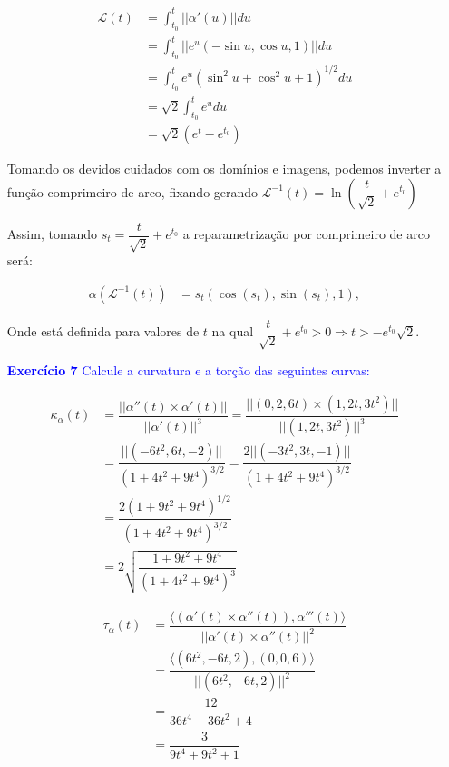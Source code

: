 \documentclass[12pt,letterpaper]{article}
\newcommand\lcur{\mathcal{L}}
\newcommand{\real}{\mathbb{R}}
\newcommand{\ex}[1]{\textcolor{blue}{\textbf{Exercício #1}}}
\newcommand{\blue}[1]{{\color{blue}{#1}}}
\begin{document}
\begin{enumerate}
	\begin{align*}
		\lcur(t)&=\int_{t_0}^{t}||\alpha'(u)||du\\
		&=\int_{t_0}^{t}||e^u(-\sin u,\cos u,1)||du\\
		&=\int_{t_0}^{t}e^u(\sin^2u+\cos^2u+1)^{1/2}du\\
		&=\sqrt2\int_{t_0}^{t}e^udu\\
		&=\sqrt2(e^t-e^{t_0})
	\end{align*}
		
		Tomando os devidos cuidados com os domínios e imagens, podemos inverter a função comprimeiro de arco, fixando  gerando $\lcur^{-1}(t)=\ln\left(\dfrac{t}{\sqrt2}+e^{t_0}\right)$
		
		Assim, tomando $s_t=\dfrac{t}{\sqrt2}+e^{t_0}$ a reparametrização por comprimeiro de arco será:
		
		\begin{align*}
			\alpha(\lcur^{-1}(t))&=s_t\left(\cos\left(s_t\right),\sin\left(s_t\right),1\right),
		\end{align*}
	
	Onde está definida para valores de $t$ na qual $\dfrac{t}{\sqrt2}+e^{t_0}>0\Rightarrow t>-e^{t_0}\sqrt2$.
	
	\item[\ex{7}] \textcolor{blue}{Calcule a curvatura e a torção das seguintes curvas:}
		\begin{enumerate}[(a)]
			\blue{
			\item $\alpha(t)=(t,t^2,t^3),t\in\real$}
				\begin{align*}
					\kappa_{\alpha}(t)&=\dfrac{||\alpha''(t)\times\alpha'(t)||}{||\alpha'(t)||^3}
					=\dfrac{||(0,2,6t)\times(1,2t,3t^2)||}{||(1,2t,3t^2)||^3}\\
					&=\dfrac{||(-6 t^2, 6 t, -2)||}{(1+4t^2+9t^4)^{3/2}}
					=\dfrac{2||(-3t^2,3t,-1)||}{(1+4t^2+9t^4)^{3/2}}\\
					&=\dfrac{2(1+9t^2+9t^4)^{1/2}}{(1+4t^2+9t^4)^{3/2}}\\
					&=2\sqrt{\dfrac{1+9t^2+9t^4}{(1+4t^2+9t^4)^3}}
				\end{align*}
			
			
			
			\begin{align*}
				\tau_\alpha(t)&=\dfrac{\langle(\alpha'(t)\times\alpha''(t)),\alpha'''(t)\rangle}{||\alpha'(t)\times\alpha''(t)||^2}\\
				&=\dfrac{\langle(6 t^2, -6 t, 2),(0,0,6)\rangle}{||(6 t^2, -6 t, 2)||^2}\\
				&=\dfrac{12}{36t^4+36t^2+4}\\
				&=\dfrac{3}{9t^4+9t^2+1}
			\end{align*}
		

\end{enumerate}
\end{enumerate}
\end{document}
